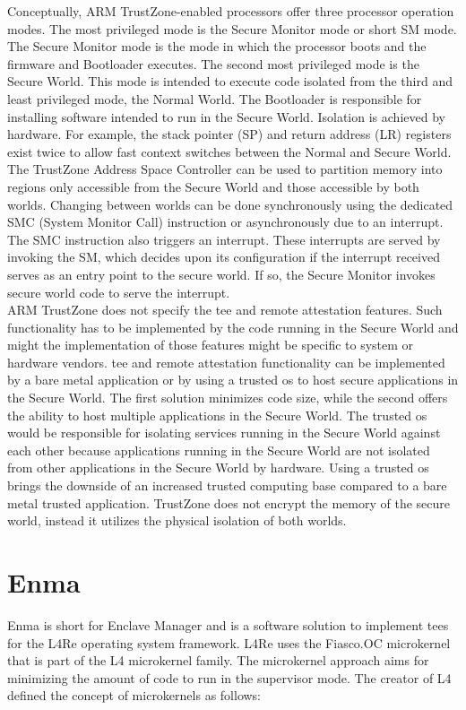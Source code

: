 Conceptually, ARM TrustZone-enabled processors offer three processor operation
modes. The most privileged mode is the Secure Monitor mode or short SM mode. The
Secure Monitor mode is the mode in which the processor boots and the firmware
and Bootloader executes. The second most privileged mode is the Secure World.
This mode is intended to execute code isolated from the third and least
privileged mode, the Normal World. The Bootloader is responsible for installing
software intended to run in the Secure World. Isolation is achieved by hardware.
For example, the stack pointer (SP) and return address (LR) registers exist
twice to allow fast context switches between the Normal and Secure World. The
TrustZone Address Space Controller can be used to partition memory into regions
only accessible from the Secure World and those accessible by both worlds.
Changing between worlds can be done synchronously using the dedicated SMC
(System Monitor Call) instruction or asynchronously due to an interrupt. The SMC
instruction also triggers an interrupt. These interrupts are served by invoking
the SM, which decides upon its configuration if the interrupt received serves as
an entry point to the secure world. If so, the Secure Monitor invokes secure
world code to serve the interrupt.\\

ARM TrustZone does not specify the \gls{tee} and remote attestation features.
Such functionality has to be implemented by the code running in the Secure World
and might the implementation of those features might be specific to system or
hardware vendors. \gls{tee} and remote attestation functionality can be
implemented by a bare metal application or by using a trusted \gls{os} to host
secure applications in the Secure World. The first solution minimizes code size,
while the second offers the ability to host multiple applications in the Secure
World. The trusted \gls{os} would be responsible for isolating services running
in the Secure World against each other because applications running in the
Secure World are not isolated from other applications in the Secure World by
hardware. Using a trusted \gls{os} brings the downside of an increased trusted
computing base compared to a bare metal trusted application. TrustZone does not
encrypt the memory of the secure world, instead it utilizes the physical
isolation of both worlds.\\

\section{Enma}
\label{sec:20:enma}
Enma is short for Enclave Manager and is a software solution to implement \glspl{tee}
for the L4Re operating system framework. \cite{reitz_isolierende_2019} L4Re uses
the Fiasco.OC microkernel that is part of the L4 microkernel family. The
microkernel approach aims for minimizing the amount of code to run in the
supervisor mode. The creator of L4 defined the concept of microkernels as
follows:

